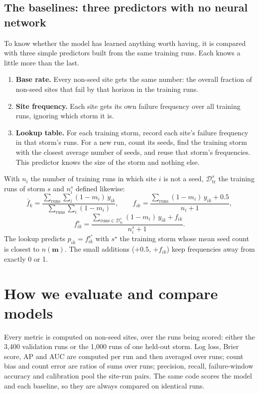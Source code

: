 \documentclass[11pt]{article}
\begin{document}
\subsection{The baselines: three predictors with no neural network}\label{sub:baselines}

To know whether the model has learned anything worth having, it is compared with three simple predictors built from the same training runs. Each knows a little more than the last.

\begin{enumerate}
\item \textbf{Base rate.} Every non-seed site gets the same number: the overall fraction of non-seed sites that fail by that horizon in the training runs.
\item \textbf{Site frequency.} Each site gets its own failure frequency over all training runs, ignoring which storm it is.
\item \textbf{Lookup table.} For each training storm, record each site's failure frequency in that storm's runs. For a new run, count its seeds, find the training storm with the closest average number of seeds, and reuse that storm's frequencies. This predictor knows the size of the storm and nothing else.
\end{enumerate}

\begin{maths}
With $n_i$ the number of training runs in which site $i$ is not a seed, $\mathcal D^s_{\mathrm{tr}}$ the training runs of storm $s$ and $n^s_i$ defined likewise:
\[
\bar f_k=\frac{\sum_{\text{runs}}\sum_i(1-m_i)\,y_{ik}}{\sum_{\text{runs}}\sum_i(1-m_i)},\qquad
f_{ik}=\frac{\sum_{\text{runs}}(1-m_i)\,y_{ik}+0.5}{n_i+1},
\]
\[
f^{s}_{ik}=\frac{\sum_{\text{runs}\in\mathcal D^s_{\mathrm{tr}}}(1-m_i)\,y_{ik}+f_{ik}}{n^s_i+1}.
\]
The lookup predicts $p_{ik}=f^{s^\star}_{ik}$ with $s^\star$ the training storm whose mean seed count is closest to $n(\mathbf m)$. The small additions ($+0.5$, $+f_{ik}$) keep frequencies away from exactly 0 or 1.
\end{maths}

\section{How we evaluate and compare models}\label{sec:score}

Every metric is computed on non-seed sites, over the runs being scored: either the 3,400 validation runs or the 1,000 runs of one held-out storm. Log loss, Brier score, AP and AUC are computed per run and then averaged over runs; count bias and count error are ratios of sums over runs; precision, recall, failure-window accuracy and calibration pool the site-run pairs. The same code scores the model and each baseline, so they are always compared on identical runs.
\end{document}
